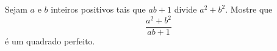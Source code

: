 Sejam $a$ e $b$ inteiros positivos tais que $ab + 1$ divide $a^{2} + b^{2}$. Mostre que \[ \frac{a^{2} + b^{2}}{ab + 1} \] é um quadrado perfeito.
